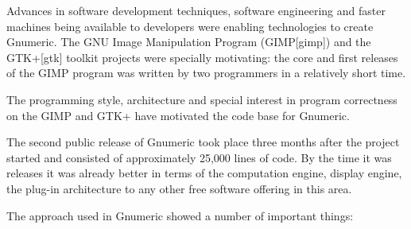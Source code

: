 \documentclass[12pt,twoside,twocolumn]{article}
\begin{document}
Advances in software development techniques, software engineering and
faster machines being available to developers were enabling
technologies to create Gnumeric.  The GNU Image Manipulation Program
(GIMP[gimp]) and the GTK+[gtk] toolkit projects were specially
motivating: the core and first releases of the GIMP program was
written by two programmers in a relatively short time.

The programming style, architecture and special interest in program
correctness on the GIMP and GTK+ have motivated the code base for
Gnumeric. 

The second public release of Gnumeric took place three months after
the project started and consisted of approximately 25,000 lines of
code.  By the time it was releases it was already better in terms of
the computation engine, display engine, the plug-in architecture to
any other free software offering in this area.

The approach used in Gnumeric showed a number of important things:
\end{document}
